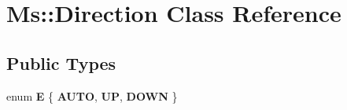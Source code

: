 \hypertarget{class_ms_1_1_direction}{}\section{Ms\+:\+:Direction Class Reference}
\label{class_ms_1_1_direction}
\subsection*{Public Types}
\begin{DoxyCompactItemize}
\item 
\mbox{\label{class_ms_1_1_direction_af7489631609413799aa02cca3cd4e05f}} 
enum {\bfseries E} \{ {\bfseries A\+U\+TO}, 
{\bfseries UP}, 
{\bfseries D\+O\+WN}
 \}
\end{DoxyCompactItemize}
